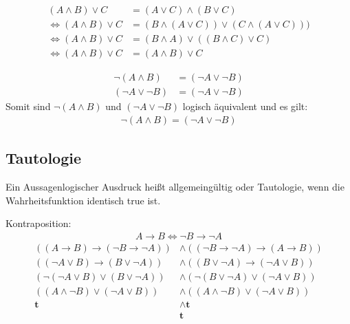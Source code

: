 \documentclass[../ana1u.tex]{subfiles}
\begin{document}
\begin{bsp}
    \begin{align*}
        (A \wedge B) \vee C &= (A \vee C) \wedge (B \vee C)\\
        \Leftrightarrow (A \wedge B) \vee C &= (B \wedge (A \vee C)) \vee (C \wedge (A \vee C)))\\
        \Leftrightarrow (A \wedge B) \vee C &=  (B \wedge A) \vee ((B \wedge C) \vee C)\\
        \Leftrightarrow (A \wedge B) \vee C &= (A \wedge B) \vee C
    \end{align*}		
\end{bsp}
\begin{bsp}
    \begin{align*}
        \neg(A \wedge B) &= (\neg A \vee \neg B)\\
        (\neg A \vee \neg B) &= (\neg A \vee \neg B)
    \end{align*}
    Somit sind \(\neg(A \wedge B)\) und \((\neg A \vee \neg B)\) logisch äquivalent und es gilt:
    \begin{align*}
        \neg(A \wedge B) = (\neg A \vee \neg B)
    \end{align*}
\end{bsp}
\subsection{Tautologie}
\begin{defi}
    Ein Aussagenlogischer Ausdruck heißt allgemeingültig oder Tautologie, wenn die Wahrheitsfunktion identisch true ist.
\end{defi}	
\begin{bsp}
    Kontraposition:
    \begin{align*}
        A \rightarrow B \Leftrightarrow \neg B \rightarrow \neg A
    \end{align*}
    \begin{align*}
        ((A \rightarrow B) \rightarrow (\neg B \rightarrow \neg A)) &\wedge ((\neg B \rightarrow \neg A) \rightarrow (A \rightarrow B))\\
        ((\neg A \vee B) \rightarrow (B \vee \neg A)) &\wedge ((B \vee \neg A) \rightarrow (\neg A \vee B))\\
        (\neg (\neg A \vee B) \vee (B \vee \neg A)) &\wedge (\neg (B \vee \neg A) \vee (\neg A \vee B))\\
        ((A \wedge \neg B) \vee (\neg A \vee B)) &\wedge ((A \wedge \neg B) \vee (\neg A \vee B))\\
        \textbf{t} &\wedge \textbf{t} \\
        &\textbf{t}        
    \end{align*}
\end{bsp}
\end{document}
